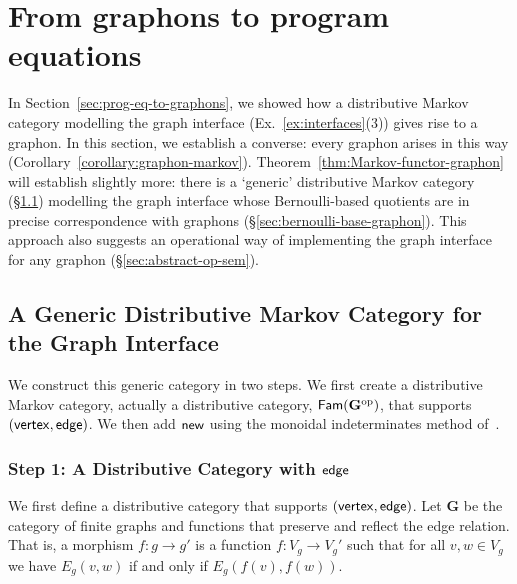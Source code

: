 \section{From graphons to program equations}\label{sec:graphons-to-equational-theories}

\newcommand{\CatCLG}{\mathbf{RGM}}
\newcommand{\Inj}{\mathbf{FinSetInj}}\label{sec:rgm-cat}
\newcommand{\Nat}{\mathrm{Nat}}

In Section~\ref{sec:prog-eq-to-graphons}, we showed how a distributive Markov category modelling the graph interface (Ex.~\ref{ex:interfaces}(3)) gives rise to a graphon.
In this section, we establish a converse: every graphon arises in this
way (Corollary~\ref{corollary:graphon-markov}). 
Theorem~\ref{thm:Markov-functor-graphon} will establish slightly more:
there is a `generic' distributive Markov category
(\S\ref{sec:generic-dmc}) modelling the graph interface whose
Bernoulli-based quotients are in precise correspondence with graphons
(\S\ref{sec:bernoulli-base-graphon}). This approach also suggests an
operational way of implementing the graph interface for any graphon (\S\ref{sec:abstract-op-sem}).

\subsection{A Generic Distributive Markov Category for the Graph Interface}
\label{sec:generic-dmc}
\newcommand{\CatG}{\mathbf{G}}
\newcommand{\GenericM}{\mathcal{T}}


We construct this generic category in two steps. We first create a distributive Markov category, actually a
distributive category, $\Fam(\CatG\op)$, that supports $(\mathsf{vertex},\mathsf{edge})$. We then add
$\mathsf{new}$ using the monoidal indeterminates method
of~\cite{hermida-tennent}.

\subsubsection{Step 1: A Distributive Category with $\mathsf{edge}$}\label{sec:edge-cat}
\newcommand{\vertices}[1]{V_{#1}}
\newcommand{\edges}[1]{E_{#1}}

We first define a distributive category that supports
$(\mathsf{vertex},\mathsf{edge})$.
Let $\CatG$ be the category of finite graphs and functions that
preserve and reflect the edge relation. That is, a morphism $f:g\to
g'$ is a function $f:\vertices g \to \vertices g'$ such that for all
$v,w\in \vertices g$ we have $\edges g(v,w)$ if and only if $\edges
g(f(v),f(w))$. 

